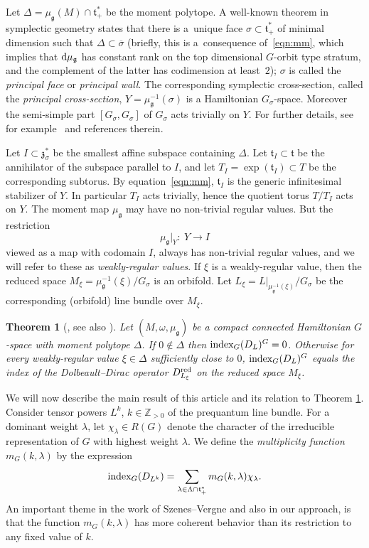 \documentclass[11pt]{article}
\numberwithin{equation}{section}
\newtheorem{Theorem}{Theorem}[section]
\newcommand{\ol}[1]{\overline{#1}}
\newcommand{\tn}[1]{\textnormal{#1}}
\def\g{\ensuremath{\mathfrak{g}}}
\def\z{\ensuremath{\mathfrak{z}}}
\def\t{\ensuremath{\mathfrak{t}}}
\def\bZ{\ensuremath{\mathbb{Z}}}
\def\index{\ensuremath{\textnormal{index}}}
\begin{document}
Let $\Delta=\mu_\g(M)\cap \t_+^\ast$ be the moment polytope. A well-known theorem in symplectic geometry states that there is a~unique face $\sigma \subset \t^\ast_+$ of minimal dimension such that $\Delta \subset \ol{\sigma}$ (briefly, this is a~consequence of~\eqref{eqn:mm}, which implies that ${\rm d}\mu_\g$ has constant rank on the top dimensional $G$-orbit type stratum, and the complement of the latter has codimension at least~$2$); $\sigma$ is called the \emph{principal face} or \emph{principal wall}. The corresponding symplectic cross-section, called the \emph{principal cross-section},
$Y=\mu_\g^{-1}(\sigma)$
is a Hamiltonian $G_\sigma$-space. Moreover the semi-simple part $[G_\sigma,G_\sigma]$ of $G_\sigma$ acts trivially on $Y$. For further details, see for example~\cite{ConvexitySympCuts} and references therein.

Let $I \subset \z_\sigma^\ast$ be the smallest affine subspace containing $\Delta$. Let $\t_I\subset \t$ be the annihilator of the subspace parallel to $I$, and let $T_I=\exp(\t_I)\subset T$ be the corresponding subtorus. By equation~\eqref{eqn:mm}, $\t_I$ is the generic infinitesimal stabilizer of $Y$. In particular $T_I$ acts trivially, hence the quotient torus $T/T_I$ acts on $Y$. The moment map $\mu_\g$ may have no non-trivial regular values. But the restriction
\[\mu_\g|_Y\colon \ Y \rightarrow I\]
viewed as a map with codomain $I$, always has non-trivial regular values, and we will refer to these as \emph{weakly-regular values}. If $\xi$ is a weakly-regular value, then the reduced space $M_\xi=\mu_\g^{-1}(\xi)/G_\sigma$ is an orbifold. Let $L_\xi=L|_{\mu_\g^{-1}(\xi)}/G_\sigma$ be the corresponding (orbifold) line bundle over $M_\xi$.

\begin{Theorem}[\cite{MeinrenkenSjamaar}, see also \cite{ParadanRiemannRoch,WittenNonAbelian}]
\label{thm:MeinSja}
Let $(M,\omega,\mu_\g)$ be a compact connected Hamiltonian $G$-space with moment polytope $\Delta$. If $0 \notin \Delta$ then $\index_G(D_L)^G=0$. Otherwise for every weakly-regular value $\xi \in \Delta$ sufficiently close to $0$, $\index_G(D_L)^G$ equals the index of the Dolbeault--Dirac operator $D^{\tn{red}}_{L_\xi}$ on the reduced space $M_\xi$.
\end{Theorem}

We will now describe the main result of this article and its relation to Theorem \ref{thm:MeinSja}. Consider tensor powers $L^k$, $k \in \bZ_{>0}$ of the prequantum line bundle. For a dominant weight $\lambda$, let $\chi_\lambda \in R(G)$ denote the character of the irreducible representation of $G$ with highest weight $\lambda$. We define the \emph{multiplicity function} $m_G(k,\lambda)$ by the expression
\begin{gather}
\label{eqn:multfcn}
\index_G(D_{L^k})=\sum_{\lambda \in \Lambda \cap \t_+^\ast} m_G(k,\lambda)\chi_\lambda.
\end{gather}
An important theme in the work of Szenes--Vergne \cite{SzenesVergne2010} and also in our approach, is that the function $m_G(k,\lambda)$ has more coherent behavior than its restriction to any fixed value of $k$.
\end{document}
